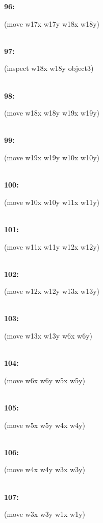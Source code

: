 \documentclass[a4paper,12pt]{article}
\newcommand{\atime}[1]{{\bf #1:}}
\newcommand{\action}[1]{{\sf #1}}
\newcommand{\listrow}[1]{\begin{minipage}[t]{11.5cm} #1 \end{minipage}}
\begin{document}
\begin{tabbing}
\atime{96} \> \listrow{\action{(move w17x w17y w18x w18y)}}\\
\atime{97} \> \listrow{\action{(inspect w18x w18y object3)}}\\
\atime{98} \> \listrow{\action{(move w18x w18y w19x w19y)}}\\
\atime{99} \> \listrow{\action{(move w19x w19y w10x w10y)}}\\
\atime{100} \> \listrow{\action{(move w10x w10y w11x w11y)}}\\
\atime{101} \> \listrow{\action{(move w11x w11y w12x w12y)}}\\
\atime{102} \> \listrow{\action{(move w12x w12y w13x w13y)}}\\
\atime{103} \> \listrow{\action{(move w13x w13y w6x w6y)}}\\
\atime{104} \> \listrow{\action{(move w6x w6y w5x w5y)}}\\
\atime{105} \> \listrow{\action{(move w5x w5y w4x w4y)}}\\
\atime{106} \> \listrow{\action{(move w4x w4y w3x w3y)}}\\
\atime{107} \> \listrow{\action{(move w3x w3y w1x w1y)}}\\
\end{tabbing}
\end{document}
